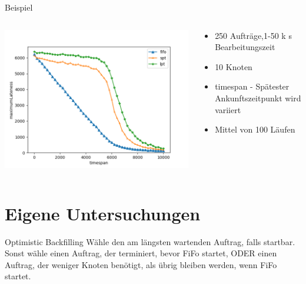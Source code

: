 \documentclass[aspectratio=169,10pt]{beamer}
\begin{document}
\begin{frame}[fragile]{Beispiel}

\begin{columns}
	\begin{column}{0.57\paperwidth}
		\vspace{0.5pt}
		\includegraphics[width=\linewidth, clip]{images/Figure_2_2}
	\end{column}
	\begin{column}[c]{0.43\paperwidth}
		\begin{itemize}
			\item 250 Auftr\"age,1-50 k s Bearbeitungszeit
			\item 10 Knoten
			\item timespan - Sp\"atester Ankunftszeitpunkt wird variiert
			\item Mittel von 100 L\"aufen
		\end{itemize}
	\end{column}
\end{columns}
\end{frame}

\section{Eigene Untersuchungen}

\begin{frame}[t,fragile]{Optimistic Backfilling}
	W\"ahle den am l\"angsten wartenden Auftrag, falls startbar. Sonst w\"ahle einen Auftrag, der terminiert, bevor FiFo startet, ODER einen Auftrag, der weniger Knoten ben\"otigt, als \"ubrig bleiben werden, wenn FiFo startet.
\end{frame}
\end{document}
